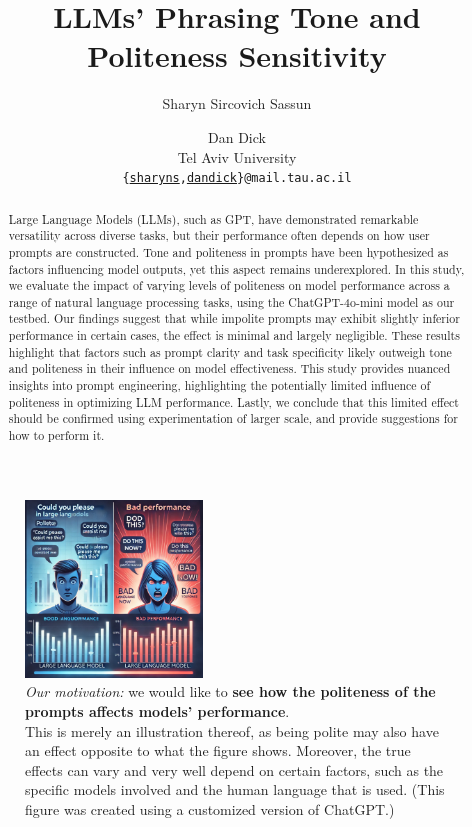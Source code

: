 \documentclass[11pt]{article}
\title{LLMs' Phrasing Tone and Politeness Sensitivity}
\author{Sharyn Sircovich Sassun \and Dan Dick \\
  Tel Aviv University \\
  \texttt{\{\href{mailto:sharyns@mail.tau.ac.il}{sharyns},\href{mailto:dandick@mail.tau.ac.il}{dandick}\}@mail.tau.ac.il} \\}
\begin{document}
\maketitle

\begin{abstract}
Large Language Models (LLMs), such as GPT, have demonstrated remarkable versatility across diverse tasks, but their performance often depends on how user prompts are constructed. Tone and politeness in prompts have been hypothesized as factors influencing model outputs, yet this aspect remains underexplored. In this study, we evaluate the impact of varying levels of politeness on model performance across a range of natural language processing tasks, using the ChatGPT-4o-mini model as our testbed. Our findings suggest that while impolite prompts may exhibit slightly inferior performance in certain cases, the effect is minimal and largely negligible. These results highlight that factors such as prompt clarity and task specificity likely outweigh tone and politeness in their influence on model effectiveness. This study provides nuanced insights into prompt engineering, highlighting the potentially limited influence of politeness in optimizing LLM performance. Lastly, we conclude that this limited effect should be confirmed using experimentation of larger scale, and provide suggestions for how to perform it.
\end{abstract}

\begin{figure}[h!]
    \centering
    \includegraphics[width=0.42\textwidth]{motivation-illustration.png}
    \caption{\textit{Our motivation:} we would like to \textbf{see how the politeness of the prompts affects models' performance}. \\ This is merely an illustration thereof, as being polite may also have an effect opposite to what the figure shows. Moreover, the true effects can vary and very well depend on certain factors, such as the specific models involved and the human language that is used. (This figure was created using a customized version of ChatGPT.)}
    \label{fig:motivation}
\end{figure}
\end{document}
